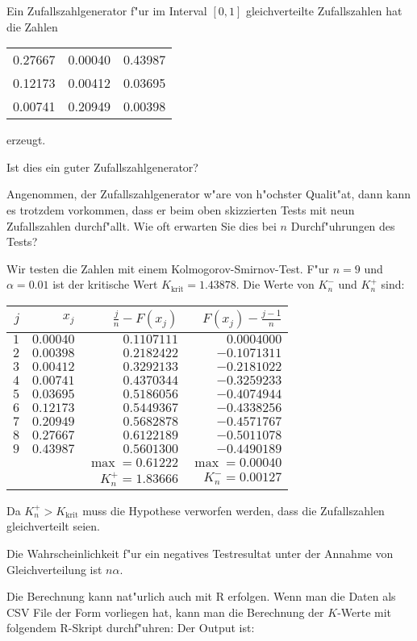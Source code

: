 Ein Zufallszahlgenerator f"ur im Interval $[0,1]$ gleichverteilte
Zufallszahlen hat die Zahlen
\begin{center}
\begin{tabular}{ccc}
0.27667& 0.00040& 0.43987\\
0.12173& 0.00412& 0.03695\\
0.00741& 0.20949& 0.00398
\end{tabular}
\end{center}
erzeugt.
\begin{teilaufgaben}
\item Ist dies ein guter Zufallszahlgenerator?
\item Angenommen, der Zufallszahlgenerator w"are von h"ochster
Qualit"at, dann kann es trotzdem vorkommen, dass er beim oben
skizzierten Tests mit neun Zufallszahlen durchf"allt.
Wie oft erwarten Sie dies bei $n$ Durchf"uhrungen des Tests?
\end{teilaufgaben}

\begin{loesung}
\begin{teilaufgaben}
\item
Wir testen die Zahlen mit einem Kolmogorov-Smirnov-Test.
F"ur $n=9$ und $\alpha=0.01$ ist der kritische Wert
$K_{\text{krit}}=1.43878$. Die Werte von
$K_n^-$ und $K_n^+$ sind:
\begin{center}
\begin{tabular}{|rrrr|}
\hline
$j$&$x_j$&$\frac{j}n-F(x_j)$&$F(x_j)-\frac{j-1}n$\\
\hline
$1$&$0.00040$&$0.1107111$&$ 0.0004000$\\
$2$&$0.00398$&$0.2182422$&$-0.1071311$\\
$3$&$0.00412$&$0.3292133$&$-0.2181022$\\
$4$&$0.00741$&$0.4370344$&$-0.3259233$\\
$5$&$0.03695$&$0.5186056$&$-0.4074944$\\
$6$&$0.12173$&$0.5449367$&$-0.4338256$\\
$7$&$0.20949$&$0.5682878$&$-0.4571767$\\
$8$&$0.27667$&$0.6122189$&$-0.5011078$\\
$9$&$0.43987$&$0.5601300$&$-0.4490189$\\
\hline
&&$\operatorname{max}=0.61222$&$\operatorname{max}= 0.00040$\\
&&$K_n^+=1.83666$&$K_n^-= 0.00127$\\
\hline
\end{tabular}
\end{center}
Da $K_n^+>K_{\text{krit}}$ muss die Hypothese verworfen werden, dass
die Zufallszahlen gleichverteilt seien.
\item Die Wahrscheinlichkeit f"ur ein negatives Testresultat unter der
Annahme von Gleichverteilung ist $n\alpha$.
\end{teilaufgaben}
Die Berechnung kann nat"urlich auch mit R erfolgen. Wenn man die Daten
als CSV File der Form
vorliegen hat, kann man die Berechnung der $K$-Werte mit folgendem
R-Skript durchf"uhren:
Der Output ist:
\end{loesung}

